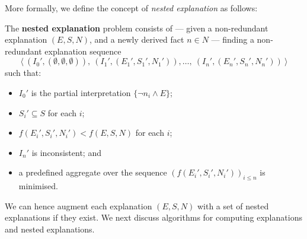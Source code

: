 More formally, we define the concept of \emph{nested explanation} as follows:

\begin{definition}\label{def:nested-problem}
The \textbf{nested explanation} problem consists of --- given a non-redundant explanation $(E, S, N)$, and a newly derived fact $n \in N$ --- finding a non-redundant explanation sequence 
    \[\langle \ (I_0',(\emptyset,\emptyset,\emptyset)),\ (I_1',(E_1',S_1',N_1')), \dots ,\ (I_n',(E_n',S_n',N_n')) \ \rangle\]
    such that:
    \begin{itemize}
        \item $I_0'$ is the partial interpretation $\{ \neg n_i \wedge E \}$;
        \item $S_i'\subseteq S$ for each $i$;
        \item $f(E_i',S_i',N_i')< f(E, S, N)$ for each $i$; 
        \item $I_n'$ is inconsistent; and
        \item a predefined aggregate over the sequence $\left(f(E_i',S_i',N_i')\right)_{i\leq n}$ is minimised.
    \end{itemize}
\end{definition}

We can hence augment each explanation $(E,S,N)$ with a set of nested explanations if they exist. We next discuss algorithms for computing explanations and nested explanations.



